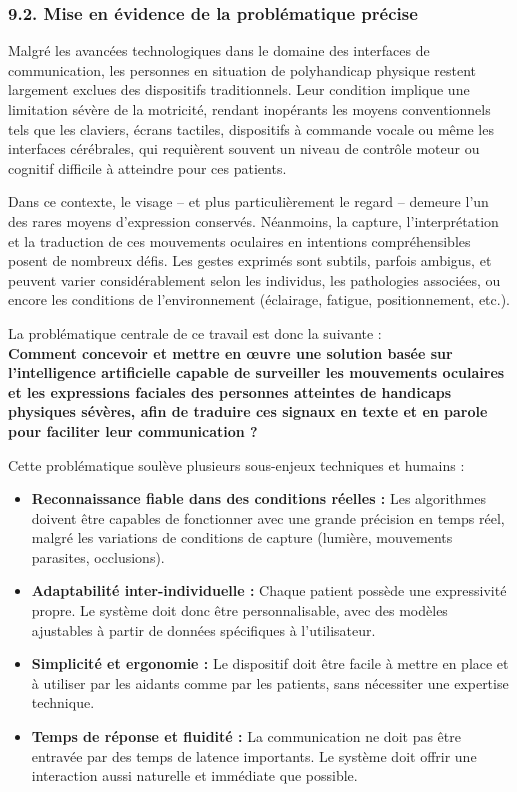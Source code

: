 \documentclass[
]{article}
\begin{document}
\hypertarget{mise-en-uxe9vidence-de-la-probluxe9matique-pruxe9cise}{%
\subsubsection{9.2. Mise en évidence de la problématique précise}\label{mise-en-uxe9vidence-de-la-probluxe9matique-pruxe9cise}}

Malgré les avancées technologiques dans le domaine des interfaces de communication, les personnes en situation de polyhandicap physique restent largement exclues des dispositifs traditionnels. Leur condition implique une limitation sévère de la motricité, rendant inopérants les moyens conventionnels tels que les claviers, écrans tactiles, dispositifs à commande vocale ou même les interfaces cérébrales, qui requièrent souvent un niveau de contrôle moteur ou cognitif difficile à atteindre pour ces patients.

Dans ce contexte, le visage -- et plus particulièrement le regard -- demeure l'un des rares moyens d'expression conservés. Néanmoins, la capture, l'interprétation et la traduction de ces mouvements oculaires en intentions compréhensibles posent de nombreux défis. Les gestes exprimés sont subtils, parfois ambigus, et peuvent varier considérablement selon les individus, les pathologies associées, ou encore les conditions de l'environnement (éclairage, fatigue, positionnement, etc.).

La problématique centrale de ce travail est donc la suivante :\\
\textbf{Comment concevoir et mettre en œuvre une solution basée sur l'intelligence artificielle capable de surveiller les mouvements oculaires et les expressions faciales des personnes atteintes de handicaps physiques sévères, afin de traduire ces signaux en texte et en parole pour faciliter leur communication ?}

Cette problématique soulève plusieurs sous-enjeux techniques et humains :

\begin{itemize}
\item
  \textbf{Reconnaissance fiable dans des conditions réelles :} Les algorithmes doivent être capables de fonctionner avec une grande précision en temps réel, malgré les variations de conditions de capture (lumière, mouvements parasites, occlusions).
\item
  \textbf{Adaptabilité inter-individuelle :} Chaque patient possède une expressivité propre. Le système doit donc être personnalisable, avec des modèles ajustables à partir de données spécifiques à l'utilisateur.
\item
  \textbf{Simplicité et ergonomie :} Le dispositif doit être facile à mettre en place et à utiliser par les aidants comme par les patients, sans nécessiter une expertise technique.
\item
  \textbf{Temps de réponse et fluidité :} La communication ne doit pas être entravée par des temps de latence importants. Le système doit offrir une interaction aussi naturelle et immédiate que possible.
\end{itemize}
\end{document}
